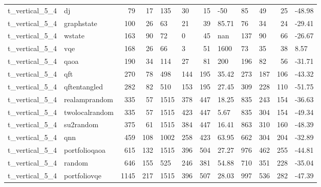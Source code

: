\begin{longtable}{llrrllrlllrl}
t\_vertical\_5\_4 & dj & 79 & 17 & 135 & 30 & 15 & -50 & 85 & 49 & 25 & -48.98 \\
t\_vertical\_5\_4 & graphstate & 100 & 26 & 63 & 21 & 39 & 85.71 & 76 & 34 & 24 & -29.41 \\
t\_vertical\_5\_4 & wstate & 163 & 90 & 72 & 0 & 45 & nan & 137 & 90 & 66 & -26.67 \\
t\_vertical\_5\_4 & vqe & 168 & 26 & 66 & 3 & 51 & 1600 & 73 & 35 & 38 & 8.57 \\
t\_vertical\_5\_4 & qaoa & 190 & 34 & 114 & 27 & 81 & 200 & 196 & 82 & 56 & -31.71 \\
t\_vertical\_5\_4 & qft & 270 & 78 & 498 & 144 & 195 & 35.42 & 273 & 187 & 106 & -43.32 \\
t\_vertical\_5\_4 & qftentangled & 282 & 82 & 510 & 153 & 195 & 27.45 & 309 & 228 & 110 & -51.75 \\
t\_vertical\_5\_4 & realamprandom & 335 & 57 & 1515 & 378 & 447 & 18.25 & 835 & 243 & 154 & -36.63 \\
t\_vertical\_5\_4 & twolocalrandom & 335 & 57 & 1515 & 423 & 447 & 5.67 & 835 & 304 & 154 & -49.34 \\
t\_vertical\_5\_4 & su2random & 375 & 61 & 1515 & 384 & 447 & 16.41 & 863 & 310 & 160 & -48.39 \\
t\_vertical\_5\_4 & qnn & 459 & 108 & 1002 & 258 & 423 & 63.95 & 662 & 304 & 204 & -32.89 \\
t\_vertical\_5\_4 & portfolioqaoa & 615 & 132 & 1515 & 396 & 504 & 27.27 & 976 & 462 & 255 & -44.81 \\
t\_vertical\_5\_4 & random & 646 & 155 & 525 & 246 & 381 & 54.88 & 710 & 351 & 228 & -35.04 \\
t\_vertical\_5\_4 & portfoliovqe & 1145 & 217 & 1515 & 396 & 507 & 28.03 & 997 & 536 & 282 & -47.39 \\
\end{longtable}
